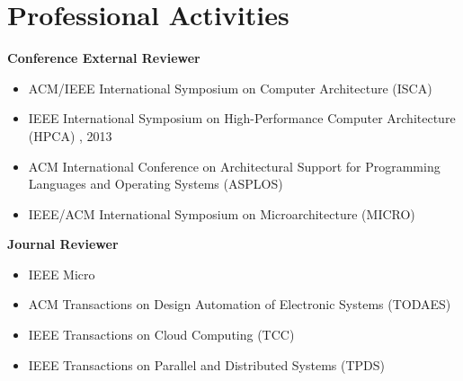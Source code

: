 \section*{Professional Activities}
\begin{description}
\item {\bf Conference External Reviewer}
  \begin{itemize}
  \item ACM/IEEE International Symposium on Computer Architecture (ISCA)
  \item IEEE International Symposium on High-Performance Computer Architecture (HPCA)
    , 2013
  \item ACM International Conference on Architectural Support for Programming Languages and Operating Systems (ASPLOS)
  \item IEEE/ACM International Symposium on Microarchitecture (MICRO)
  \end{itemize}

\item {\bf Journal Reviewer}
  \begin{itemize}
  \item IEEE Micro 
  \item ACM Transactions on Design Automation of Electronic Systems (TODAES)
  \item IEEE Transactions on Cloud Computing (TCC)
  \item IEEE Transactions on Parallel and Distributed Systems (TPDS)
  \end{itemize}

\end{description}
